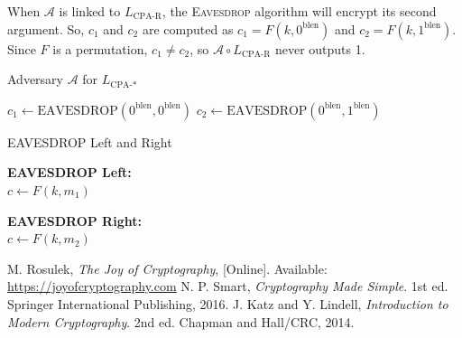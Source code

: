 \documentclass[12pt,openany]{book}
\theoremstyle{definition}
\begin{document}
	When \( \mathcal{A} \) is linked to \( L_{\text{CPA-R}} \), the
	\textsc{Eavesdrop} algorithm will encrypt its second argument. So,
	\( c_1 \) and \( c_2 \) are computed as \( c_1 = F(k, 0^{\text{blen}}) \) and \( c_2 = F(k, 1^{\text{blen}}) \).
	Since \( F \) is a permutation, \( c_1 \neq c_2 \), so \( \mathcal{A} \circ L_{\text{CPA-R}} \) never outputs 1.
	
	\begin{algorithm}[H]
		\SetAlgoLined
		
		\caption{Adversary \(\mathcal{A}\) for \( L_{\text{CPA-*}} \)}
		
		\( c_1 \leftarrow \text{EAVESDROP}(0^{\text{blen}}, 0^{\text{blen}}) \)\;
		\( c_2 \leftarrow \text{EAVESDROP}(0^{\text{blen}}, 1^{\text{blen}}) \)\;
		\;
		
	\end{algorithm}
	
	\begin{algorithm}[H]
		\SetAlgoLined
		
		
		\caption{EAVESDROP Left and Right}
		
		\textbf{EAVESDROP Left:}\\
		\( c \leftarrow F(k, m_1) \)\;
		\;
		
		\textbf{EAVESDROP Right:}\\
		\( c \leftarrow F(k, m_2) \)\;
		\;
		
	\end{algorithm}
	


	\newpage
	\begin{thebibliography}{9}
		M. Rosulek, \textit{The Joy of Cryptography}, [Online]. Available: \url{https://joyofcryptography.com}
		N. P. Smart, \textit{Cryptography Made Simple}. 1st ed. Springer International Publishing, 2016.
		J. Katz and Y. Lindell, \textit{Introduction to Modern Cryptography}. 2nd ed. Chapman and Hall/CRC, 2014.	
\end{thebibliography}

\end{document}
